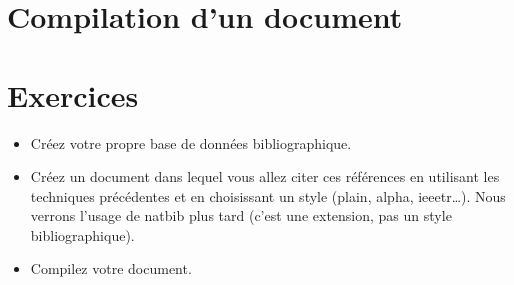 \section{Compilation d'un document}
\label{sec:compilation-bibtex}


\vfill
{}
\vfill




\section{Exercices}
\label{sec:exercices}
\vfill
\begin{itemize}
\item Créez votre propre base de données bibliographique.
\item Créez un document dans lequel vous allez citer ces références en
  utilisant les techniques précédentes et en choisissant un style
  (plain, alpha, ieeetr\ldots). Nous verrons l'usage de natbib plus
  tard (c'est une extension, pas un style bibliographique).
\item Compilez votre document.
\end{itemize}
\vfill





